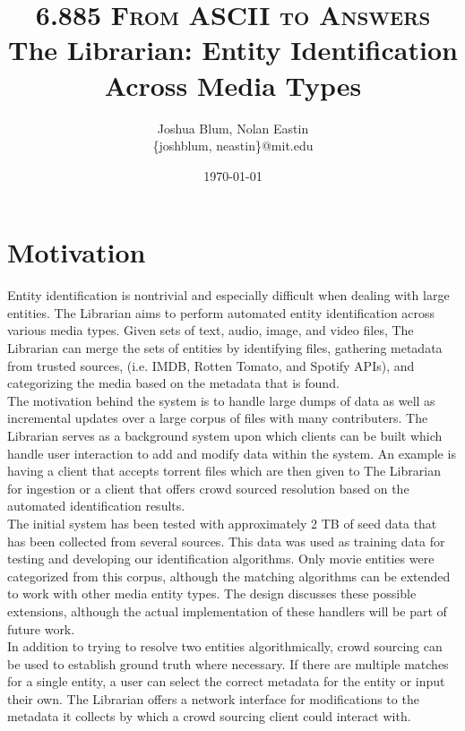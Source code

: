 \documentclass[paper=a4, fontsize=11pt]{scrartcl} %
\title{ 
\normalfont \normalsize 
\textsc{6.885 From ASCII to Answers} %
\horrule{0.5pt} %
\large The Librarian: Entity Identification Across Media Types %
\horrule{1pt} %
}
\author{Joshua Blum, Nolan Eastin \\ \{joshblum, neastin\}@mit.edu}
\date{\normalsize\today} %
\numberwithin{equation}{section} %
\numberwithin{figure}{section} %
\numberwithin{table}{section} %
\begin{document}
\maketitle %

\section{Motivation}
Entity identification is nontrivial and especially difficult when dealing with large entities. The Librarian aims to perform automated entity identification across various media types. Given sets of text, audio, image, and video files, The Librarian can merge the sets of entities by identifying files, gathering metadata from trusted sources, (i.e. IMDB, Rotten Tomato, and Spotify APIs), and categorizing the media based on the metadata that is found. \\

The motivation behind the system is to handle large dumps of data as well as incremental updates over a large corpus of files with many contributers. The Librarian serves as a background system upon which clients can be built which handle user interaction to add and modify data within the system. An example is having a client that accepts torrent files which are then given to The Librarian for ingestion or a client that offers crowd sourced resolution based on the automated identification results.\\

The initial system has been tested with approximately 2 TB of seed data that has been collected from several sources. This data was used as training data for testing and developing our identification algorithms. Only movie entities were categorized from this corpus, although the matching algorithms can be extended to work with other media entity types. The design discusses these possible extensions, although the actual implementation of these handlers will be part of future work.\\

In addition to trying to resolve two entities algorithmically, crowd sourcing can be used to establish ground truth where necessary. If there are multiple matches for a single entity, a user can select the correct metadata for the entity or input their own. The Librarian offers a network interface for modifications to the metadata it collects by which a crowd sourcing client could interact with.\\
\end{document}
